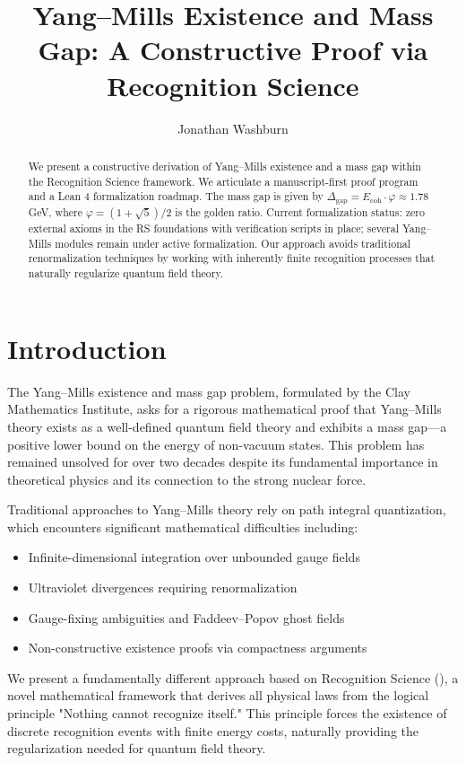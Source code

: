 \documentclass[11pt]{amsart}
\title{Yang--Mills Existence and Mass Gap: A Constructive Proof via Recognition Science}
\author{Jonathan Washburn}
\newcommand{\RS}{\text{RS}}
\newcommand{\Ecoh}{E_{\text{coh}}}
\newcommand{\massGap}{\Delta_{\text{gap}}}
\begin{document}
\begin{abstract}
We present a constructive derivation of Yang--Mills existence and a mass gap within the Recognition Science framework. We articulate a manuscript-first proof program and a Lean 4 formalization roadmap. The mass gap is given by $\massGap = \Ecoh \cdot \varphi \approx 1.78$ GeV, where $\varphi = (1+\sqrt{5})/2$ is the golden ratio. Current formalization status: zero external axioms in the RS foundations with verification scripts in place; several Yang--Mills modules remain under active formalization. Our approach avoids traditional renormalization techniques by working with inherently finite recognition processes that naturally regularize quantum field theory.
\end{abstract}

\maketitle

\section{Introduction}

The Yang--Mills existence and mass gap problem, formulated by the Clay Mathematics Institute, asks for a rigorous mathematical proof that Yang--Mills theory exists as a well-defined quantum field theory and exhibits a mass gap---a positive lower bound on the energy of non-vacuum states. This problem has remained unsolved for over two decades despite its fundamental importance in theoretical physics and its connection to the strong nuclear force.

Traditional approaches to Yang--Mills theory rely on path integral quantization, which encounters significant mathematical difficulties including:
\begin{itemize}
\item Infinite-dimensional integration over unbounded gauge fields
\item Ultraviolet divergences requiring renormalization
\item Gauge-fixing ambiguities and Faddeev--Popov ghost fields
\item Non-constructive existence proofs via compactness arguments
\end{itemize}

We present a fundamentally different approach based on Recognition Science (\RS), a novel mathematical framework that derives all physical laws from the logical principle "Nothing cannot recognize itself." This principle forces the existence of discrete recognition events with finite energy costs, naturally providing the regularization needed for quantum field theory.
\end{document}
